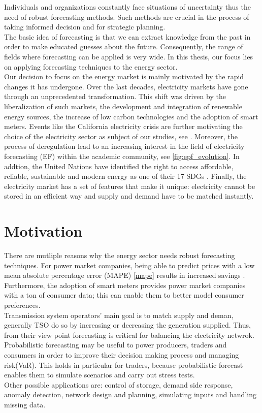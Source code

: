 Individuals and organizations constantly face situations of uncertainty thus the need of robust forecasting methods. Such methods are crucial in the process of taking informed decision and for strategic planning.
\\
The basic idea of forecasting is that we can extract knowledge from the past in order to make educated guesses about the future. Consequently, the range of fields where forecasting can be applied is very wide.
In this thesis, our focus lies on applying forecasting techniques to the energy sector. 
\\
Our decision to focus on the energy market is mainly motivated by the rapid changes it has undergone. %
Over the last decades, electricity markets have gone through an unprecedented transformation. This shift was driven by the liberalization of such markets, the development and integration of renewable energy sources, the  increase of low carbon technologies and the adoption of smart meters. Events like the California electricity crisis are further motivating the choice of the electricity sector as subject of our studies, see \cite{california}.
Moreover, the process of deregulation lead to an increasing interest in the field of electricity forecasting (EF) within the academic community, see \ref{fig:epf_evolution}.
In addtion, the United Nations have identified the right to access affordable, reliable, sustainable and modern energy as one of their 17 SDGs \cite{un_sdgs}.
Finally, the electricity market has a set of features that make it unique: electricity cannot be stored in an efficient way and supply and demand have to be matched instantly.
\\
\section{Motivation}
There are mutliple reasons why the energy sector needs robust forecasting techniques.
For power market companies, being able to predict prices with a low mean absolute percentage error (MAPE) \ref{mape} results in increased savings \cite{savings}. Furthermore, the adoption of smart meters provides power market companies with a ton of consumer data; this can enable them to better model consumer preferences.
\\
Transmission system operators' main goal is to match supply and deman, generally TSO do so by increasing or decreasing the generation supplied. Thus, from their view point forecasting is critical for balancing the electricity netwrok.
\\
Probabilistic forecasting may be useful to power producers, traders and consumers in order to improve their decision making process and managing risk(VaR). This holds in particular for traders, because probabilistic forecast enables them to simulate scenarios and carry out stress tests.
\\
Other possible applications are: control of storage, demand side response, anomaly detection, network design and planning, simulating inputs and handling missing data.
\\

